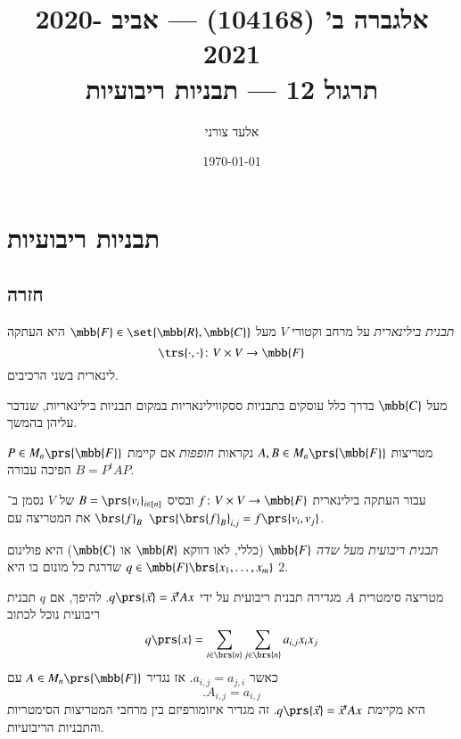 \documentclass[a4paper,10pt,oneside,openany]{article}
\title{
אלגברה ב' (104168) \textenglish{---} אביב 2020-2021
\\
תרגול 12 \textenglish{---}
תבניות ריבועיות
}
\author{אלעד צורני}
\date{\today}
\begin{document}
\maketitle

\section{תבניות ריבועיות}

\subsection{חזרה}

\begin{definition}
\emph{תבנית בילינארית}
על מרחב וקטורי
$V$
מעל
$\mbb{F} \in \set{\mbb{R}, \mbb{C}}$
היא העתקה
\[\trs{\cdot,\cdot} \colon V \times V \to \mbb{F}\]
לינארית בשני הרכיבים.
\end{definition}

\begin{remark}
מעל
$\mbb{C}$
בדרך כלל עוסקים בתבניות ססקווילינאריות במקום תבניות בילינאריות, שנדבר עליהן בהמשך.
\end{remark}

\begin{definition}
מטריצות
$A,B \in M_n\prs{\mbb{F}}$
נקראות
\emph{חופפות}
אם קיימת
$P \in M_n\prs{\mbb{F}}$
הפיכה
עבורה
$B = P^t A P$.
\end{definition}

\begin{definition}
עבור העתקה בילינארית
$f \colon V \times V \to \mbb{F}$
ובסיס
$B = \prs{v_i}_{i \in [n]}$
של
$V$
נסמן ב־%
$\brs{f}_B$
את המטריצה עם
$\prs{\brs{f}_B}_{i,j} = f\prs{v_i, v_j}$.
\end{definition}

\begin{definition}
\emph{תבנית ריבועית מעל שדה
$\mbb{F}$}
(כללי, לאו דווקא
$\mbb{R}$
או
$\mbb{C}$)
היא פולינום
$q \in \mbb{F}\brs{x_1, \ldots, x_m}$
שדרגת כל מונום בו היא
$2$.
\end{definition}

\begin{remark}
מטריצה סימטרית
$A$
מגדירה תבנית ריבועית על ידי
$q\prs{\vec{x}} = \vec{x}^t A x$.
להיפך, אם
$q$
תבנית ריבועית נוכל לכתוב
\[q\prs{x} = \sum_{i \in \brs{n}} \sum_{j \in \brs{n}} a_{i,j} x_i x_j\]
כאשר
$a_{i,j} = a_{j,i}$.
אז נגדיר
$A \in M_n\prs{\mbb{F}}$
עם
\[\text{.} A_{i,j} = a_{i,j}\]
היא מקיימת
$q\prs{\vec{x}} = \vec{x}^t A x$.
זה מגדיר איזומורפיזם בין מרחבי המטריצות הסימטריות והתבניות הריבועיות.
\end{remark}
\end{document}
